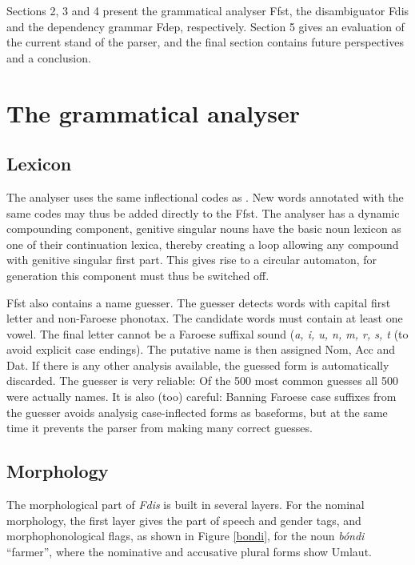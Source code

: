 \documentclass[11pt]{article}
\begin{document}
Sections 2, 3 and 4 present the grammatical analyser Ffst, the disambiguator Fdis and the dependency grammar Fdep, respectively. Section 5 gives an evaluation of the current stand of the parser, and the final section contains future perspectives and a conclusion.

\section{The grammatical analyser}




\subsection{Lexicon}

The analyser uses the same inflectional codes as  \cite{Poulsen98}.  New words annotated with the same codes may thus be added directly to the Ffst. The analyser has a dynamic compounding component, genitive singular nouns have the basic noun lexicon as one of their continuation lexica, thereby creating a loop allowing any compound with genitive singular first part. This gives rise to a circular automaton, for generation this component must thus be switched off.

Ffst also contains a name guesser. The guesser detects words with capital first letter and non-Faroese phonotax. The candidate words must contain at least one vowel. The final letter cannot be a Faroese suffixal sound (\textit{a, i, u, n, m, r, s, t} (to avoid explicit case endings). The putative name is then assigned Nom, Acc and Dat. If there is any other analysis available, the guessed form is automatically discarded. The guesser is very reliable: Of the 500 most common guesses all 500 were actually names. It is also (too) careful: Banning Faroese case suffixes from the guesser avoids analysig case-inflected forms as baseforms, but at the same time it prevents the parser from making many correct guesses. 


\subsection{Morphology}

The morphological part of \textit{Fdis} is built in several layers. For the nominal morphology, the first layer gives the part of speech and gender tags, and morphophonological flags, as shown in Figure \ref{bondi}, for the noun \textit{bóndi} “farmer”, where the nominative and accusative plural forms show Umlaut.
\end{document}

